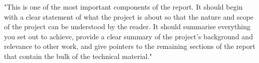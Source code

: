 "This is one of the most important components of the report. It should begin with a clear statement of what the project is about so that the nature and scope of the project can be understood by the reader. It should summarise everything you set out to achieve, provide a clear summary of the project's background and relevance to other work, and give pointers to the remaining sections of the report that contain the bulk of the technical material."